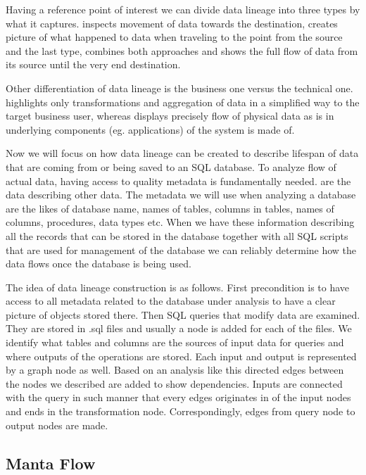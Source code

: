 Having a reference point of interest we can divide data lineage into three types by what it captures.  inspects movement of data towards the destination,  creates picture of what happened to data when traveling to the point from the source and the last type,  combines both approaches and shows the full flow of data from its source until the very end destination.

Other differentiation of data lineage is the business one versus the technical one.
 highlights only transformations and aggregation of data in a simplified way to the target business user, whereas  displays precisely flow of physical data as is in underlying components (eg. applications) of the system is made of.

Now we will focus on how data lineage can be created to describe lifespan of data that are coming from or being saved to an SQL database.
To analyze flow of actual data, having access to quality metadata is fundamentally needed.
 are the data describing other data. The metadata we will use when analyzing a database are the likes of database name, names of tables, columns in tables, names of columns, procedures, data types etc.
When we have these information describing all the records that can be stored in the database together with all SQL scripts that are used for management of the database we can reliably determine how the data flows once the database is being used.

The idea of data lineage construction is as follows. First precondition is to have access to all metadata related to the database under analysis to have a clear picture of objects stored there. 
Then SQL queries that modify data are examined. They are stored in .sql files and usually a node is added for each of the files. We identify what tables and columns are the sources of input data for queries and where outputs of the operations are stored. Each input and output is represented by a graph node as well. Based on an analysis like this directed edges between the nodes we described are added to show dependencies. Inputs are connected with the query in such manner that every edges originates in of the input nodes and ends in the transformation node. Correspondingly, edges from query node to output nodes are made.


\subsection{Manta Flow}

